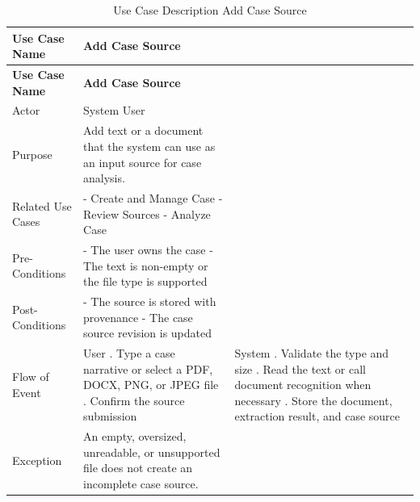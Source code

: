\begin{longtable}{@{}>{\raggedright\arraybackslash}p{} >{\raggedright\arraybackslash}p{} >{\raggedright\arraybackslash}p{}@{}}
\caption{Use Case Description Add Case Source}\label{tab:3-3}\\
\toprule
\textbf{Use Case Name} & \textbf{Add Case Source} & \textbf{} \\
\midrule
\endfirsthead
\textbf{Use Case Name} & \textbf{Add Case Source} & \textbf{} \\
\midrule
\endhead
Actor & System User &  \\
Purpose & Add text or a document that the system can use as an input source for case analysis. &  \\
Related Use Cases & - Create and Manage Case \newline - Review Sources \newline - Analyze Case &  \\
Pre-Conditions & - The user owns the case \newline - The text is non-empty or the file type is supported &  \\
Post-Conditions & - The source is stored with provenance \newline - The case source revision is updated &  \\
Flow of Event & User \newline 1. Type a case narrative or select a PDF, DOCX, PNG, or JPEG file \newline 2. Confirm the source submission & System \newline 1. Validate the type and size \newline 2. Read the text or call document recognition when necessary \newline 3. Store the document, extraction result, and case source \\
Exception & An empty, oversized, unreadable, or unsupported file does not create an incomplete case source. &  \\
\bottomrule
\end{longtable}

